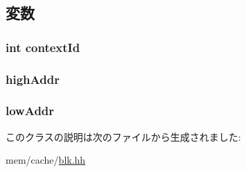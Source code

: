 \subsection{変数}
\hypertarget{classCacheBlk_1_1Lock_a5093029b16dfe14cea58c94fea417e01}{
\subsubsection[{contextId}]{\setlength{\rightskip}{0pt plus 5cm}int {\bf contextId}}}
\label{classCacheBlk_1_1Lock_a5093029b16dfe14cea58c94fea417e01}
\hypertarget{classCacheBlk_1_1Lock_ad1022e5c9295bf55310b4a4e96d13ef1}{
\subsubsection[{highAddr}]{ {\bf highAddr}}}
\label{classCacheBlk_1_1Lock_ad1022e5c9295bf55310b4a4e96d13ef1}
\hypertarget{classCacheBlk_1_1Lock_ae931bbd66f3984254c5845fe61176eef}{
\subsubsection[{lowAddr}]{ {\bf lowAddr}}}
\label{classCacheBlk_1_1Lock_ae931bbd66f3984254c5845fe61176eef}


このクラスの説明は次のファイルから生成されました:\begin{DoxyCompactItemize}
\item 
mem/cache/\hyperlink{blk_8hh}{blk.hh}\end{DoxyCompactItemize}
